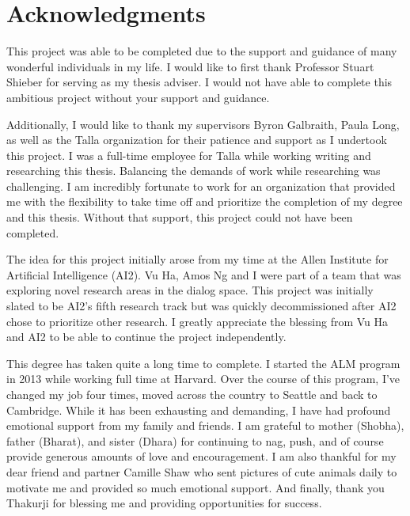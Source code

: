 
\chapter*{Acknowledgments}

This project was able to be completed due to the support and guidance of many wonderful individuals in my life. I would like to first thank Professor Stuart Shieber for serving as my thesis adviser. I would not have able to complete this ambitious project without your support and guidance. 

Additionally, I would like to thank my supervisors Byron Galbraith, Paula Long, as well as the Talla organization for their patience and support as I undertook this project. I was a full-time employee for Talla while working writing and researching this thesis. Balancing the demands of work while researching was challenging. I am incredibly fortunate to work for an organization that provided me with the flexibility to take time off and prioritize the completion of my degree and this thesis. Without that support, this project could not have been completed.

The idea for this project initially arose from my time at the Allen Institute for Artificial Intelligence (AI2). Vu Ha, Amos Ng and I were part of a team that was exploring novel research areas in the dialog space. This project was initially slated to be AI2's fifth research track but was quickly decommissioned after AI2 chose to prioritize other research. I greatly appreciate the blessing from Vu Ha and AI2 to be able to continue the project independently. 

This degree has taken quite a long time to complete. I started the ALM program in 2013 while working full time at Harvard. Over the course of this program, I've changed my job four times, moved across the country to Seattle and back to Cambridge. While it has been exhausting and demanding, I have had profound emotional support from my family and friends. I am grateful to mother (Shobha), father (Bharat), and sister (Dhara) for continuing to nag, push, and of course provide generous amounts of love and encouragement. I am also thankful for my dear friend and partner Camille Shaw who sent pictures of cute animals daily to motivate me and provided so much emotional support. And finally, thank you Thakurji for blessing me and providing opportunities for success.  


